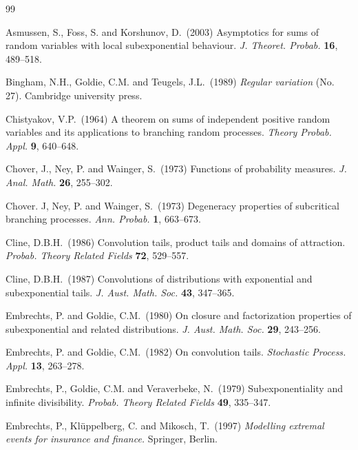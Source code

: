 \documentclass[12pt,leqno]{amsart}
\newcommand{\1}{{\mathbf 1}}
\begin{document}
\begin{thebibliography}{99}
\baselineskip12pt


{\sc Asmussen, S., Foss, S. and Korshunov, D.}\ (2003)  
Asymptotics for sums of random variables with local subexponential behaviour. 
{\em J. Theoret. Probab.} {\bf 16}, 489--518.

{\sc Bingham, N.H., Goldie, C.M. and Teugels, J.L.}\ (1989) 
{\em Regular variation} (No. 27). Cambridge university press.

{\sc Chistyakov, V.P.}\ (1964) 
A theorem on sums of independent positive random variables and its applications to branching random processes. 
{\em Theory Probab. Appl.} {\bf 9}, 640--648. 

{\sc Chover, J., Ney, P. and Wainger, S.}\ (1973)
Functions of probability measures. 
{\em J. Anal. Math.} {\bf 26}, 255--302. 

{\sc Chover. J, Ney, P. and Wainger, S.}\ (1973)
Degeneracy properties of subcritical branching processes. 
{\em Ann. Probab.} {\bf 1}, 663--673. 

{\sc Cline, D.B.H.}\ (1986)
Convolution tails, product tails and domains of attraction. 
{\em Probab. Theory Related Fields} {\bf 72}, 529--557.

{\sc Cline, D.B.H.}\ (1987)  
Convolutions of distributions with exponential and subexponential tails. 
{\em J. Aust. Math. Soc.} {\bf 43}, 347--365. 

{\sc Embrechts, P. and Goldie, C.M.}\ (1980) 
On closure and factorization properties of subexponential and related distributions. 
{\em J. Aust. Math. Soc.} {\bf 29}, 243--256.

{\sc Embrechts, P. and Goldie, C.M.}\ (1982) 
On convolution tails. 
{\em Stochastic Process. Appl.} {\bf 13}, 263--278.

{\sc Embrechts, P., Goldie, C.M. and Veraverbeke, N.}\ (1979) 
Subexponentiality and infinite divisibility. 
{\em Probab. Theory Related Fields} {\bf 49}, 335--347. 

{\sc Embrechts, P., Kl\"uppelberg, C. and Mikosch, T.}\ (1997)
{\em Modelling extremal events for insurance and finance.}
Springer, Berlin.



\end{thebibliography}
\end{document}
